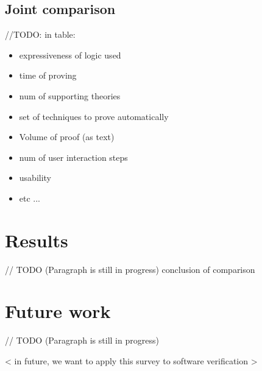 \documentclass[article]{aaltoseries}
\begin{document}


\subsection{Joint comparison}
\label{sec:joint_comparison}

//TODO: in table:
\begin{itemize}
	\itemsep0em
	\item expressiveness of logic used
	\item time of proving
	\item num of supporting theories
	\item set of techniques to prove automatically
	\item Volume of proof (as text)
	\item num of user interaction steps
	\item usability
	\item etc ...
\end{itemize}



\section{Results}
\label{sec:results}

// TODO (Paragraph is still in progress)
conclusion of comparison



\section{Future work}
\label{sec:future_work}

// TODO (Paragraph is still in progress)

< in future, we want to apply this survey to software verification >





\end{document}
